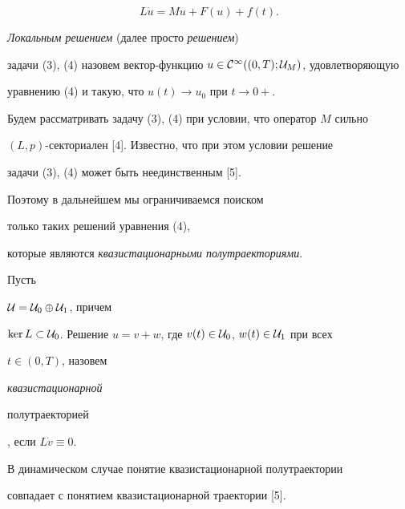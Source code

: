 \begin{equation}


L\Dot u=M u+F(u)+f(t).


\end{equation}


{\it Локальным решением} (далее просто {\it решением}) 


задачи (3), (4) назовем вектор-функцию $u \in {\cal C}^{\infty


}((0,T) ; {\cal U}_M)$, удовлетворяющую


уравнению (4) и такую, что $u(t) \to u_0$ при $t \to 0+$.





Будем рассматривать задачу (3), (4) при условии, что оператор $M$ сильно


$(L,p)$-секториален [4]. Известно, что при этом условии решение 


задачи (3), (4) может быть неединственным [5].


Поэтому в дальнейшем мы ограничиваемся поиском 


только таких решений уравнения (4),


которые являются {\it квазистационарными полутраекториями}.





\begin{defn}


Пусть


${\cal U}={\cal U}_0\oplus {\cal U}_1$, причем


$\ker L \subset {\cal U}_0$. Решение $u=v+w$, где $v(t)\in


{\cal U}_0$, $w(t) \in {\cal U}_1$ при всех


$t \in (0,T)$, назовем {\it квазистационарной


полутраекторией}, если $L \Dot v \equiv 0$.


\end{defn}





\begin{note}


В динамическом случае понятие квазистационарной полутраектории


совпадает с понятием квазистационарной траектории [5].


\end{note}





